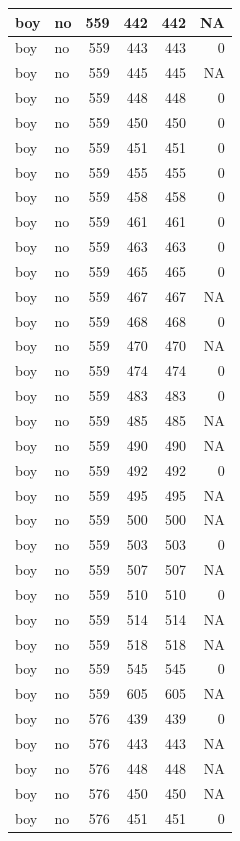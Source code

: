 \documentclass[man]{apa6}
\begin{document}
\begin{tabular}{l|l|r|r|r|r}
\hline
boy & no & 559 & 442 & 442 & NA\\
\hline
boy & no & 559 & 443 & 443 & 0\\
\hline
boy & no & 559 & 445 & 445 & NA\\
\hline
boy & no & 559 & 448 & 448 & 0\\
\hline
boy & no & 559 & 450 & 450 & 0\\
\hline
boy & no & 559 & 451 & 451 & 0\\
\hline
boy & no & 559 & 455 & 455 & 0\\
\hline
boy & no & 559 & 458 & 458 & 0\\
\hline
boy & no & 559 & 461 & 461 & 0\\
\hline
boy & no & 559 & 463 & 463 & 0\\
\hline
boy & no & 559 & 465 & 465 & 0\\
\hline
boy & no & 559 & 467 & 467 & NA\\
\hline
boy & no & 559 & 468 & 468 & 0\\
\hline
boy & no & 559 & 470 & 470 & NA\\
\hline
boy & no & 559 & 474 & 474 & 0\\
\hline
boy & no & 559 & 483 & 483 & 0\\
\hline
boy & no & 559 & 485 & 485 & NA\\
\hline
boy & no & 559 & 490 & 490 & NA\\
\hline
boy & no & 559 & 492 & 492 & 0\\
\hline
boy & no & 559 & 495 & 495 & NA\\
\hline
boy & no & 559 & 500 & 500 & NA\\
\hline
boy & no & 559 & 503 & 503 & 0\\
\hline
boy & no & 559 & 507 & 507 & NA\\
\hline
boy & no & 559 & 510 & 510 & 0\\
\hline
boy & no & 559 & 514 & 514 & NA\\
\hline
boy & no & 559 & 518 & 518 & NA\\
\hline
boy & no & 559 & 545 & 545 & 0\\
\hline
boy & no & 559 & 605 & 605 & NA\\
\hline
boy & no & 576 & 439 & 439 & 0\\
\hline
boy & no & 576 & 443 & 443 & NA\\
\hline
boy & no & 576 & 448 & 448 & NA\\
\hline
boy & no & 576 & 450 & 450 & NA\\
\hline
boy & no & 576 & 451 & 451 & 0\\

\end{tabular}
\end{document}
